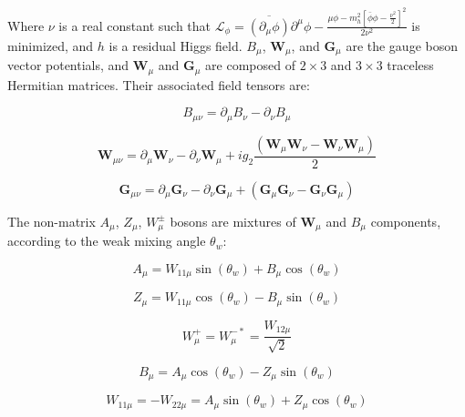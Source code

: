 \documentclass[12pt,a4paper,pagesize=pdftex]{scrartcl}
\begin{document}
Where $\nu$ is a real constant such that $\mathcal{L}_\phi=\overline{\left(\partial_\mu\phi\right)}\partial^\mu\phi-\frac{\mu\phi-m_h^2\left[\bar{\phi}\phi-\frac{\nu^2}{2}\right]^2}{2\nu^2}$ is minimized, and $h$ is a residual Higgs field. $B_\mu$, $\mathbf{W}_\mu$, and $\mathbf{G}_\mu$ are the gauge boson vector potentials, and $\mathbf{W}_\mu$ and $\mathbf{G}_\mu$ are composed of $2\times3$ and $3\times3$ traceless Hermitian matrices. Their associated field tensors are:

\begin{equation*}
	B_{\mu\nu}=\partial_\mu B_\nu-\partial_\nu B_\mu
\end{equation*}

\begin{equation*}
	\mathbf{W}_{\mu\nu}=\partial_\mu\mathbf{W}_\nu-\partial_\nu\mathbf{W}_\mu+ig_2\frac{\left(\mathbf{W}_\mu\mathbf{W}_\nu-\mathbf{W}_\nu\mathbf{W}_\mu\right)}{2}
\end{equation*}

\begin{equation*}
	\mathbf{G}_{\mu\nu}=\partial_\mu\mathbf{G}_\nu-\partial_\nu\mathbf{G}_\mu+\left(\mathbf{G}_\mu\mathbf{G}_\nu-\mathbf{G}_\nu\mathbf{G}_\mu\right)
\end{equation*}

The non-matrix $A_\mu$, $Z_\mu$, $W_\mu^\pm$ bosons are mixtures of $\mathbf{W}_\mu$ and $B_\mu$ components, according to the weak mixing angle $\theta_w$:

\begin{equation*}
	A_\mu=W_{11\mu}\sin\left(\theta_w\right)+B_\mu\cos\left(\theta_w\right)
\end{equation*}

\begin{equation*}
	Z_\mu=W_{11\mu}\cos\left(\theta_w\right)-B_\mu\sin\left(\theta_w\right)
\end{equation*}

\begin{equation*}
	W_\mu^+=W_\mu^{-*}=\frac{W_{12\mu}}{\sqrt{2}}
\end{equation*}

\begin{equation*}
	B_\mu=A_\mu\cos\left(\theta_w\right)-Z_\mu\sin\left(\theta_w\right)
\end{equation*}

\begin{equation*}
	W_{11\mu}=-W_{22\mu}=A_\mu\sin\left(\theta_w\right)+Z_\mu\cos\left(\theta_w\right)
\end{equation*}
\end{document}
